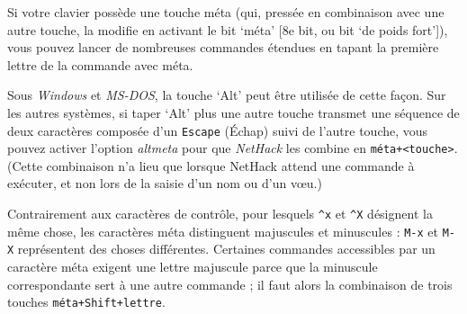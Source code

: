 \documentclass[titlepage]{article}
\begin{document}
\noindent Si votre clavier possède une touche méta (qui, pressée en combinaison
avec une autre touche, la modifie en activant le bit `méta' [8e bit, ou bit
`de poids fort']), vous pouvez lancer de nombreuses commandes étendues en tapant
la première lettre de la commande avec méta.

Sous \textit{Windows} et \textit{MS-DOS},
la touche `Alt' peut être utilisée de cette façon.
Sur les autres systèmes, si taper `Alt' plus une autre touche transmet une
séquence de deux caractères composée d'un \texttt{Escape} (Échap)
suivi de l'autre touche, vous pouvez activer l'option \textit{altmeta}
pour que \textit{NetHack} les combine en \texttt{méta+<touche>}.
(Cette combinaison n'a lieu que lorsque NetHack attend une
commande à exécuter, et non lors de la saisie d'un nom ou
d'un vœu.)

Contrairement aux caractères de contrôle, pour lesquels \texttt{\textasciicircum x} et \texttt{\textasciicircum X} désignent la même
chose, les caractères méta distinguent majuscules et minuscules : \texttt{M-x} et \texttt{M-X}
représentent des choses différentes.  Certaines commandes accessibles par un caractère
méta exigent une lettre majuscule parce que la minuscule
correspondante sert à une autre commande ; il faut alors la combinaison de trois touches
\texttt{méta+Shift+lettre}.
\end{document}
